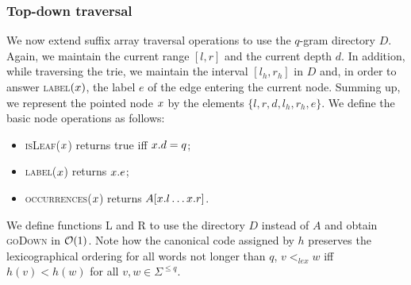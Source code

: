 \subsubsection{Top-down traversal}

We now extend suffix array traversal operations to use the $q$-gram directory $D$.
Again, we maintain the current range $[l,r]$ and the current depth $d$.
In addition, while traversing the trie, we maintain the interval $[l_h,r_h]$ in $D$ and, in order to answer \textsc{label}$(x)$, the label $e$ of the edge entering the current node.
Summing up, we represent the pointed node $x$ by the elements $\{ l, r, d, l_h, r_h, e \}$.
We define the basic node operations as follows:
\begin{itemize}
\item \textsc{isLeaf}($x$) returns true iff $x.d=q$;
\item \textsc{label}($x$) returns $x.e$;
\item \textsc{occurrences}($x$) returns $A[x.l \dots x.r]$.
\end{itemize}

We define functions \textsc{L} and \textsc{R} to use the directory $D$ instead of $A$ and obtain \textsc{goDown} in $\mathcal{O}(1)$.
Note how the canonical code assigned by $h$ preserves the lexicographical ordering for all words not longer than $q$, \ie $v <_{lex} w$ iff $h(v) < h(w)$ for all $v,w \in \Sigma^{\leq q}$.

